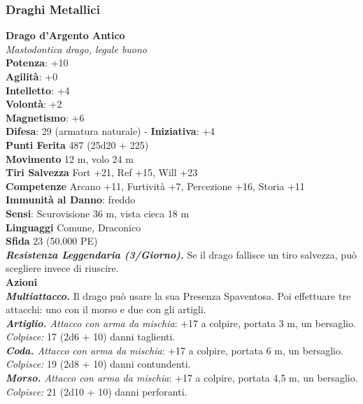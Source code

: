 \begin{multicols}{2}
\subsubsection{Draghi Metallici}

\medskip\textbf{Drago d'Argento Antico}\\
\emph{Mastodontica drago, legale buono}\\
\textbf{Potenza}: +10\\
\textbf{Agilità}: +0\\
\textbf{Intelletto}: +4\\
\textbf{Volontà}: +2\\
\textbf{Magnetismo}: +6\\
\textbf{Difesa}: 29 (armatura naturale) - \textbf{Iniziativa}: +4\\
\textbf{Punti Ferita} 487 (25d20 + 225) \\
\textbf{Movimento} 12 m, volo 24 m\\
\textbf{Tiri Salvezza} Fort +21, Ref +15, Will +23\\
\textbf{Competenze} Arcano +11, Furtività +7, Percezione +16, Storia +11\\
\textbf{Immunità al Danno}: freddo\\
\textbf{Sensi}: Scurovisione 36 m, vista cieca 18 m\\
\textbf{Linguaggi} Comune, Draconico\\
\textbf{Sfida} 23 (50.000 PE)\smallskip\\
\emph{\textbf{Resistenza Leggendaria (3/Giorno).}} Se il drago fallisce un tiro salvezza, può scegliere invece di riuscire.\\
\smallskip\textbf{Azioni} \\
\emph{\textbf{Multiattacco.}} Il drago può usare la sua Presenza Spaventosa. Poi effettuare tre attacchi: uno con il morso e due con gli artigli.\\
\emph{\textbf{Artiglio.} Attacco con arma da mischia}: +17 a colpire, portata 3 m, un bersaglio.\\
\emph{Colpisce:} 17 (2d6 + 10) danni taglienti.\\
\emph{\textbf{Coda.} Attacco con arma da mischia}: +17 a colpire, portata 6 m, un bersaglio.\\
\emph{Colpisce:} 19 (2d8 + 10) danni contundenti. \\
\emph{\textbf{Morso.} Attacco con arma da mischia}: +17 a colpire, portata 4,5 m, un bersaglio.\\
\emph{Colpisce:} 21 (2d10 + 10) danni perforanti.\\

\end{multicols}
